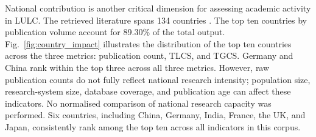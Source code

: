 \documentclass[]{interact}
\theoremstyle{plain}%
\theoremstyle{definition}
\theoremstyle{remark}
\DeclareRobustCommand{\DIFadd}[1]{{\protect\color{DIFaddcolor}\uwave{#1}}}
\DeclareRobustCommand{\DIFdel}[1]{{\protect\color{DIFdelcolor}\sout{#1}}}
\def\DIFadd#1{#1}%
\def\DIFdel#1{}%
\begin{document}
National contribution is another critical dimension for assessing academic activity in LULC. The retrieved literature spans 134 countries\DIFdel{,} \DIFdel{demonstrating} \DIFdel{the} \DIFdel{worldwide} \DIFdel{importance} \DIFdel{of} \DIFdel{this} \DIFdel{field}. The top ten countries by publication volume account for 89.30\% of the total output. Fig.~\ref{fig:country_impact} illustrates the distribution of the top ten countries across the three metrics: publication count, TLCS, and TGCS. Germany and China rank within the top three across all three metrics. However, raw publication counts do not fully reflect national research intensity; \DIFdel{contributions} \DIFdel{are} \DIFdel{better} \DIFdel{assessed} \DIFdel{relative} \DIFdel{to} population size\DIFadd{,} \DIFadd{research-system} \DIFadd{size}\DIFadd{,} \DIFadd{database} \DIFadd{coverage}\DIFadd{,} and \DIFdel{the} \DIFdel{number} \DIFadd{publication} \DIFadd{age} \DIFadd{can} \DIFadd{affect} \DIFadd{these} \DIFadd{indicators}\DIFadd{.} \DIFadd{No} \DIFadd{normalised} \DIFadd{comparison} of \DIFdel{active} \DIFdel{PhD} \DIFdel{researchers} \DIFdel{in} \DIFdel{each} \DIFdel{country}\DIFdel{.} \DIFdel{When} \DIFdel{these} \DIFdel{normalization} \DIFdel{factors} \DIFdel{are} \DIFdel{considered}\DIFdel{,} \DIFdel{the} \DIFdel{relative} \DIFdel{standing} \DIFdel{of} \DIFdel{some} \DIFdel{countries} \DIFdel{may} \DIFdel{shift}\DIFdel{.} \DIFdel{Furthermore}\DIFdel{,} \DIFdel{several} \DIFdel{prestigious} \DIFdel{institutions} \DIFdel{are} \DIFdel{based} \DIFdel{in} \DIFdel{these} \DIFdel{two} \DIFdel{nations}\DIFdel{,} \DIFdel{underscoring} \DIFdel{their} \DIFdel{dominant} \DIFdel{influence} \DIFdel{in} \DIFdel{both} \DIFdel{the} \DIFdel{local} \DIFdel{academic} \DIFdel{community} \DIFdel{and} \DIFdel{the} \DIFdel{global} \DIFdel{scientific} \DIFdel{sphere} \DIFadd{national} \DIFadd{research} \DIFadd{capacity} \DIFadd{was} \DIFadd{performed}. Six countries, including China, Germany, India, France, the UK, and Japan, consistently rank among the top ten across all indicators \DIFadd{in} \DIFadd{this} \DIFadd{corpus}. 
\end{document}
